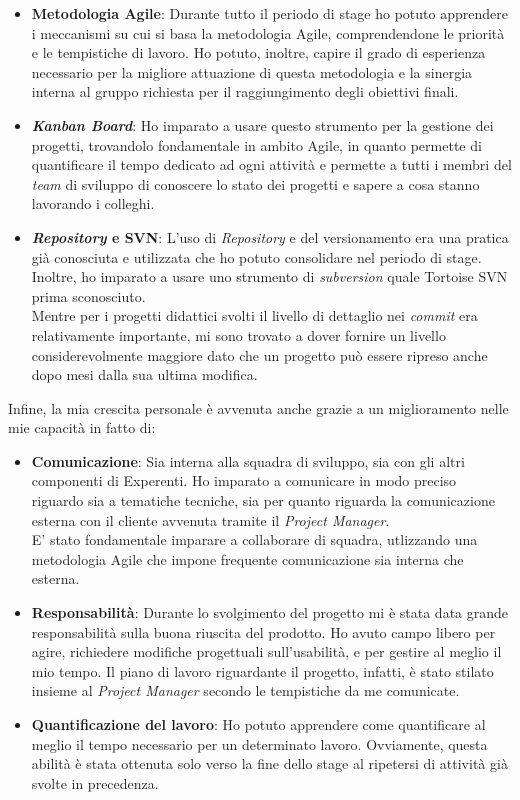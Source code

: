 \begin{itemize}
	\item \textbf{Metodologia Agile}: Durante tutto il periodo di stage ho potuto apprendere i meccanismi su cui si basa la metodologia Agile, comprendendone le priorit\`a e le tempistiche di lavoro. Ho potuto, inoltre, capire il grado di esperienza necessario per la migliore attuazione di questa metodologia e la sinergia interna al gruppo richiesta per il raggiungimento degli obiettivi finali.
	
	\item \textbf{\textit{Kanban Board}}: Ho imparato a usare questo strumento per la gestione dei progetti, trovandolo fondamentale in ambito Agile, in quanto permette di quantificare il tempo dedicato ad ogni attivit\`a e permette a tutti i membri del \textit{team} di sviluppo di conoscere lo stato dei progetti e sapere a cosa stanno lavorando i colleghi.
	
	\item \textbf{\textit{Repository} e SVN}: L'uso di \textit{Repository} e del versionamento era una pratica gi\`a conosciuta e utilizzata che ho potuto consolidare nel periodo di stage. Inoltre, ho imparato a usare uno strumento di \textit{subversion} quale Tortoise SVN prima sconosciuto.\\
	Mentre per i progetti didattici svolti il livello di dettaglio nei \textit{commit} era relativamente importante, mi sono trovato a dover fornire un livello considerevolmente maggiore dato che un progetto pu\`o essere ripreso anche dopo mesi dalla sua ultima modifica.
\end{itemize}
\noindent
Infine, la mia crescita personale \`e avvenuta anche grazie a un miglioramento nelle mie capacit\`a in fatto di:

\begin{itemize}
	\item \textbf{Comunicazione}: Sia interna alla squadra di sviluppo, sia con gli altri componenti di Experenti. Ho imparato a comunicare in modo preciso riguardo sia a tematiche tecniche, sia per quanto riguarda la comunicazione esterna con il cliente avvenuta tramite il \textit{Project Manager}.\\
	E' stato fondamentale imparare a collaborare di squadra, utlizzando una metodologia Agile che impone frequente comunicazione sia interna che esterna.
	
	\item \textbf{Responsabilit\`a}: Durante lo svolgimento del progetto mi \`e stata data grande responsabilit\`a sulla buona riuscita del prodotto. Ho avuto campo libero per agire, richiedere modifiche progettuali sull'usabilit\`a, e per gestire al meglio il mio tempo. Il piano di lavoro riguardante il progetto, infatti, \`e stato stilato insieme al \textit{Project Manager} secondo le tempistiche da me comunicate.
	
	\item \textbf{Quantificazione del lavoro}: Ho potuto apprendere come quantificare al meglio il tempo necessario per un determinato lavoro. Ovviamente, questa abilit\`a \`e stata ottenuta solo verso la fine dello stage al ripetersi di attivit\`a gi\`a svolte in precedenza.
\end{itemize}

